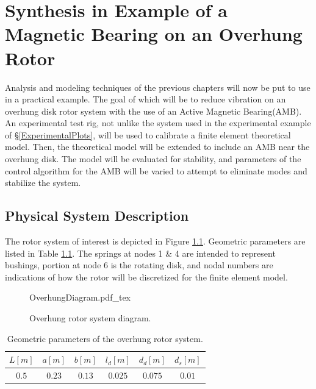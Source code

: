 \chapter{Synthesis in Example of a Magnetic Bearing on an Overhung Rotor}\label{MagExample}
Analysis and modeling techniques of the previous chapters will now be put to use in a practical example. The goal of which will be to reduce vibration on an overhung disk rotor system with the use of an Active Magnetic Bearing(AMB). An experimental test rig, not unlike the system used in the experimental example of \S\ref{ExperimentalPlots}, will be used to calibrate a  finite element theoretical model. Then, the theoretical model will be extended to include an AMB near the overhung disk. The model will be evaluated for stability, and parameters of the control algorithm for the AMB will be varied to attempt to eliminate modes and stabilize the system.
\section{Physical System Description}
The rotor system of interest is depicted in Figure \ref{fig:OverhungDiagram}. Geometric parameters are listed in Table \ref{tab:GeometricParametersofOverhung}. The springs at nodes 1 \& 4 are intended to represent bushings, portion at node 6 is the rotating disk, and nodal numbers are indications of how the rotor will be discretized for the finite element model.
\begin{figure}
	\centering
	\def\svgwidth{250pt}
	{OverhungDiagram.pdf_tex}
	\caption{Overhung rotor system diagram.}
	\label{fig:OverhungDiagram}
\end{figure}
\begin{table}
	\centering
	\caption{Geometric parameters of the overhung rotor system.}
	\label{tab:GeometricParametersofOverhung}
	\begin{tabular}{cccccc}
		$ L[m] $&$ a[m] $&$ b[m] $&$ l_d[m] $&$ d_d[m] $&$ d_s[m] $\\\hline
		$ 0.5 $&$ 0.23 $&$ 0.13 $&$ 0.025 $&$ 0.075 $&$ 0.01 $
		\end{tabular}
\end{table}
